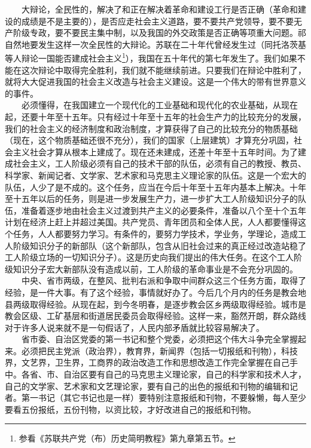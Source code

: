 \documentclass[cn,11pt,chinese]{elegantbook}
\begin{document}
　　大辩论，全民性的，解决了和正在解决着革命和建设工行是否正确（革命和建设的成绩是不是主要的），是否应走社会主义道路，要不要共产党领导，要不要无产阶级专政，要不要民主集中制，以及我国的外交政策是否正确等项重大问题。祁自然地要发生这样一次全民性的大辩论。苏联在二十年代曾经发生过（同托洛茨基等人辩论一国能否建成社会主义\footnote[1]{ 参看《苏联共产党（布）历史简明教程》第九章第五节。}），我国在五十年代的第七年发生了。我们如果不能在这次辩论中取得完全胜利，我们就不能继续前进。只要我们在辩论中胜利了，就将大大促进我国的社会主义改造与社会主义建设。这是一个伟大的带有世界意义的事件。\\
　　必须懂得，在我国建立一个现代化的工业基础和现代化的农业基础，从现在起，还要十年至十五年。只有经过十年至十五年的社会生产力的比较充分的发展，我们的社会主义的经济制度和政治制度，才算获得了自己的比较充分的物质基础（现在，这个物质基础还很不充分），我们的国家（上层建筑）才算充分巩固，社会主义社会才算从根本上建成了。现在还未建成，还差十年至十五年时间。为了建成社会主义，工人阶级必须有自己的技术干部的队伍，必须有自己的教授、教员、科学家、新闻记者、文学家、艺术家和马克思主义理论家的队伍。这是一个宏大的队伍，人少了是不成的。这个任务，应当在今后十年至十五年内基本上解决。十年至十五年以后的任务，则是进一步发展生产力，进一步扩大工人阶级知识分子的队伍，准备着逐步地由社会主义过渡到共产主义的必要条件，准备以八个至十个五年计划在经济上赶上并超过美国。共产党员、青年团员和全体人民，人人都要懂得这个任务，人人都要努力学习。有条件的，要努力学技术，学业务，学理论，造成工人阶级知识分子的新部队（这个新部队，包含从旧社会过来的真正经过改造站稳了工人阶级立场的一切知识分子）。这是历史向我们提出的伟大任务。在这个工人阶级知识分子宏大新部队没有造成以前，工人阶级的革命事业是不会充分巩固的。\\
　　中央、省市两级，在整风、批判右派和争取中间群众这三个任务方面，取得了经验，是一件大事。有了这个经验，事情就好办了。今后几个月内的任务是教会地县两级取得经验。从现在起，到今冬明春，是逐步教会区乡两级取得经验。城市是教会区级、工矿基层和街道居民委员会取得经验。这样一来，豁然开朗，群众路线对于许多人说来就不是一句假话了，人民内部矛盾就比较容易解决了。\\
　　省市委、自治区党委的第一书记和整个党委，必须把这个伟大斗争完全掌握起来。必须把民主党派（政治界），教育界，新闻界（包括一切报纸和刊物），科技界，文艺界，卫生界，工商界的政治改造工作和思想改造工作完全掌握在自己手中。各省、市、自治区要有自己的马克思主义理论家，自己的科学家和技术人才，自己的文学家、艺术家和文艺理论家，要有自己的出色的报纸和刊物的编辑和记者。第一书记（其它书记也是一样）要特别注意报纸和刊物，不要躲懒，每人至少要看五份报纸，五份刊物，以资比较，才好改进自己的报纸和刊物。\\
\end{document}
